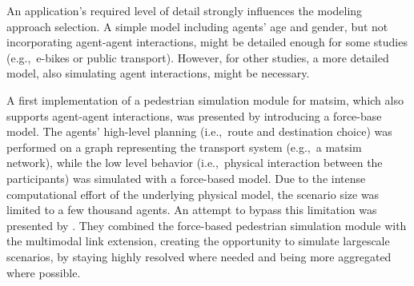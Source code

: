 An application's required level of detail strongly influences the modeling approach selection. A simple model including agents' age and gender, but not incorporating agent-agent interactions, might be detailed enough for some studies (e.g.,\ e-bikes or public transport). However, for other studies, a more detailed model, also simulating agent interactions, might be necessary. 

A first implementation of a pedestrian simulation module for \gls{matsim}, which also supports agent-agent interactions, was presented by \citet{00LaemmelPlaue2012CollisionAvoidingModels} introducing a force-base model. The agents' high-level planning (i.e.,\ route and destination choice) was performed on a graph representing the transport system (e.g.,\ a \gls{matsim} network), while the low level behavior (i.e.,\ physical interaction between the participants) was simulated with a force-based model. Due to the intense computational effort of the underlying physical model, the scenario size was limited to a few thousand agents. An attempt to bypass this limitation was presented by \citet{00DoblerLaemmel2012MultiModalEvac}. They combined the force-based pedestrian simulation module with the \gls{multimodal} link extension, creating the opportunity to simulate \gls{largescale} scenarios, by staying highly resolved where needed and being more aggregated where possible.

